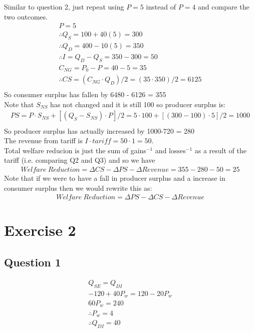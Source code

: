 \documentclass{article}
\begin{document}
Similar to question 2, just repeat using $P=5$ instead of $P=4$ and compare the two outcomes. \\
\begin{gather*}
  P = 5 \\
  \therefore Q_{S} = 100 + 40(5) = 300 \\
  \therefore Q_{D} = 400 - 10(5) = 350 \\
  \therefore I = Q_{D} - Q_{S} = 350 - 300 = 50 \\
  C_{NG} = P_{0} - P = 40 - 5 = 35 \\
  \therefore CS = (C_{NG} \cdot Q_{D})/2 = (35 \cdot 350)/2 = 6125 \\
\end{gather*}
So consumer surplus has fallen by 6480 - 6126 = 355 \\
Note that $S_{NS}$ has not changed and it is still 100 so producer surplus is:
\begin{gather*}
  PS = P \cdot S_{NS} +  [(Q_{S} - S_{NS}) \cdot P]/2 = 5 \cdot 100 +[(300 - 100) \cdot 5] /2  = 1000 \\
\end{gather*}
So producer surplus has actually increased by 1000-720 = 280 \\
The revenue from tariff is $I \cdot tariff = 50 \cdot 1 = 50$. \\
Total welfare reducion is just the sum of gains$^{-1}$ and losses$^{-1}$ as a result of the tariff (i.e. comparing Q2 and Q3) and so we have
\begin{gather*}
  Welfare \ Reduction = \Delta CS - \Delta PS - \Delta Revenue = 355 - 280 - 50 = 25
\end{gather*}
Note that if we were to have a fall in producer surplus and a increase in consumer surplus then we would rewrite this as:
\begin{gather*}
  Welfare \ Reduction = \Delta PS - \Delta CS - \Delta Revenue
\end{gather*}

\section{Exercise 2}
\vspace{6mm}
\subsection{Question 1}

\begin{gather*}
  Q_{SE} = Q_{DI} \\
  -120 + 40 P_{w} = 120 - 20 P_{w} \\
  60 P_{w} = 240 \\
  \therefore P_{w} = 4 \\
  \therefore Q_{DI} = 40
\end{gather*}
\end{document}
